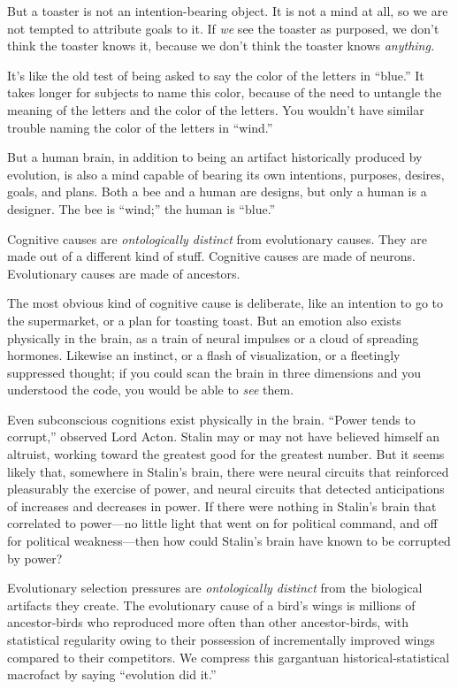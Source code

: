{
 But a toaster is not an intention-bearing object. It is not a mind
at all, so we are not tempted to attribute goals to it. If \textit{we}
see the toaster as purposed, we don't think the toaster
knows it, because we don't think the toaster knows
\textit{anything.}}

{
 It's like the old test of being asked to say the
color of the letters in ``blue.'' It
takes longer for subjects to name this color, because of the need to
untangle the meaning of the letters and the color of the letters. You
wouldn't have similar trouble naming the color of the
letters in ``wind.''}

{
 But a human brain, in addition to being an artifact historically
produced by evolution, is also a mind capable of bearing its own
intentions, purposes, desires, goals, and plans. Both a bee and a human
are designs, but only a human is a designer. The bee is
``wind;'' the human is
``blue.''}

{
 Cognitive causes are \textit{ontologically distinct} from
evolutionary causes. They are made out of a different kind of stuff.
Cognitive causes are made of neurons. Evolutionary causes are made of
ancestors.}

{
 The most obvious kind of cognitive cause is deliberate, like an
intention to go to the supermarket, or a plan for toasting toast. But
an emotion also exists physically in the brain, as a train of neural
impulses or a cloud of spreading hormones. Likewise an instinct, or a
flash of visualization, or a fleetingly suppressed thought; if you
could scan the brain in three dimensions and you understood the code,
you would be able to \textit{see} them.}

{
 Even subconscious cognitions exist physically in the brain.
``Power tends to corrupt,'' observed
Lord Acton. Stalin may or may not have believed himself an altruist,
working toward the greatest good for the greatest number. But it seems
likely that, somewhere in Stalin's brain, there were
neural circuits that reinforced pleasurably the exercise of power, and
neural circuits that detected anticipations of increases and decreases
in power. If there were nothing in Stalin's brain that
correlated to power---no little light that went on for political
command, and off for political weakness---then how could
Stalin's brain have known to be corrupted by power?}

{
 Evolutionary selection pressures are \textit{ontologically
distinct} from the biological artifacts they create. The evolutionary
cause of a bird's wings is millions of ancestor-birds
who reproduced more often than other ancestor-birds, with statistical
regularity owing to their possession of incrementally improved wings
compared to their competitors. We compress this gargantuan
historical-statistical macrofact by saying ``evolution
did it.''}

